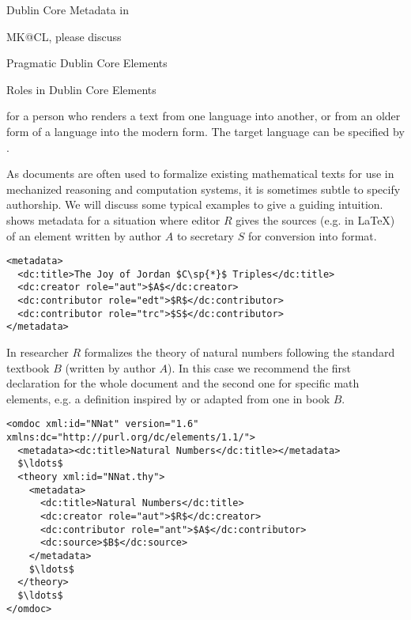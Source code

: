 \begin{module}[id=dc-elements]
\begin{omgroup}[id=dc-elements]{Dublin Core Metadata in {\omdoc}}
\begin{newpart}{MK@CL, please discuss}
\begin{omgroup}{Pragmatic Dublin Core Elements}
\begin{omgroup}[id=dc-roles]{Roles in Dublin Core Elements}
\begin{description}
  for a person who renders a text from one language into another, or from an older
  form of a language into the modern form. The target language can be specified by
  {}.
\end{description}
As {\omdoc} documents are often used to formalize existing mathematical texts for use in
mechanized reasoning and computation systems, it is sometimes subtle to specify
authorship.  We will discuss some typical examples to give a guiding intuition.
{} shows metadata for a situation where editor $R$ gives the sources
(e.g. in {\LaTeX}) of an element written by author $A$ to secretary $S$ for conversion
into {\omdoc} format.
\begin{lstlisting}[label=lst:sec-edt,mathescape,
  caption={A Document with Editor ({\snippet{edt}}) and  Transcriber ({\snippet{trc}})},
  index={metadata,dc:title,dc:creator,dc:contributor}]
<metadata>
  <dc:title>The Joy of Jordan $C\sp{*}$ Triples</dc:title>
  <dc:creator role="aut">$A$</dc:creator>
  <dc:contributor role="edt">$R$</dc:contributor>
  <dc:contributor role="trc">$S$</dc:contributor>
</metadata>
\end{lstlisting}

In {} researcher $R$ formalizes the theory of natural numbers
following the standard textbook $B$ (written by author $A$). In this case we
recommend the first declaration for the whole document and the second one for
specific math elements, e.g. a definition inspired by or adapted from one in book
$B$.

\begin{lstlisting}[label=lst:formalize,mathescape,
  caption={A Formalization with Scientific Antecedent ({\snippet{ant}})},
  index={metadata,dc:title,dc:creator}]
<omdoc xml:id="NNat" version="1.6" xmlns:dc="http://purl.org/dc/elements/1.1/">
  <metadata><dc:title>Natural Numbers</dc:title></metadata>                              
  $\ldots$
  <theory xml:id="NNat.thy">
    <metadata>
      <dc:title>Natural Numbers</dc:title>
      <dc:creator role="aut">$R$</dc:creator>
      <dc:contributor role="ant">$A$</dc:contributor>
      <dc:source>$B$</dc:source>
    </metadata>
    $\ldots$
  </theory>
  $\ldots$
</omdoc>
\end{lstlisting} 
\end{omgroup}
\end{omgroup}
\end{newpart}
\end{omgroup}
\end{module}

